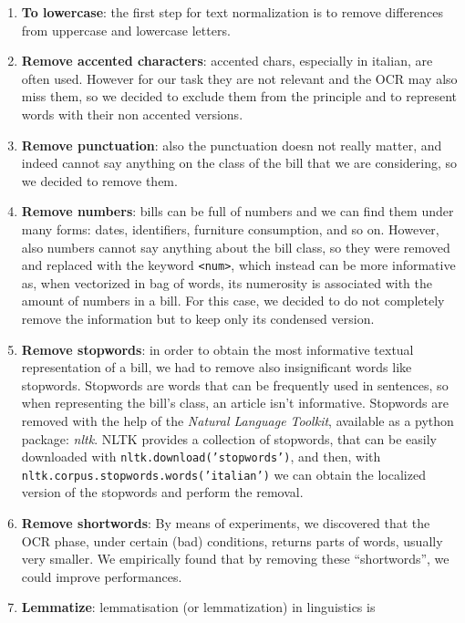 \documentclass[10pt,twocolumn,letterpaper]{article}
\newcommand\codeinline[1]{\texttt{#1}}  %
\begin{document}
\begin{enumerate}
  \item \textbf{To lowercase}: the first step for text normalization is to
    remove differences from uppercase and lowercase letters.
  \item \textbf{Remove accented characters}: accented chars, especially in
    italian, are often used. However for our task they are not relevant
    and the OCR may also miss them, so we decided to exclude them from
    the principle and to represent words with their non accented
    versions.
  \item \textbf{Remove punctuation}: also the punctuation doesn not really
    matter, and indeed cannot say anything on the class of the bill
    that we are considering, so we decided to remove them.
  \item \textbf{Remove numbers}: bills can be full of numbers and we
    can find them under many forms: dates,
    identifiers, furniture consumption, and so on. However, also
    numbers cannot say anything about the bill class, so they were
    removed and replaced with the keyword \codeinline{<num>}, which
    instead can be more informative as, when vectorized in bag of words,
    its numerosity is associated with the amount of numbers in a
    bill. For this case, we decided to do not completely remove the
    information but to keep only its condensed version.
  \item \textbf{Remove stopwords}: in order to obtain the most informative
    textual representation of a bill, we had to remove also
    insignificant words like stopwords. Stopwords are words that can be
    frequently used in sentences, so when representing the
    bill's class, an article isn't informative. Stopwords are removed
    with the help of the \emph{Natural Language Toolkit}, available as
    a python package: \emph{nltk}. NLTK provides a collection of
    stopwords, that can be easily downloaded with
    \codeinline{nltk.download('stopwords')}, and then, with
    \codeinline{nltk.corpus.stopwords.words('italian')} we can obtain the
    localized version of the stopwords and perform the removal.
  \item \textbf{Remove shortwords}: By means of experiments, we discovered    that the OCR phase, under certain (bad) conditions, returns parts of
    words, usually very smaller. We empirically found that by removing
    these ``shortwords'', we could improve performances.
  \item \textbf{Lemmatize}: lemmatisation (or lemmatization) in linguistics is

\end{enumerate}
\end{document}
